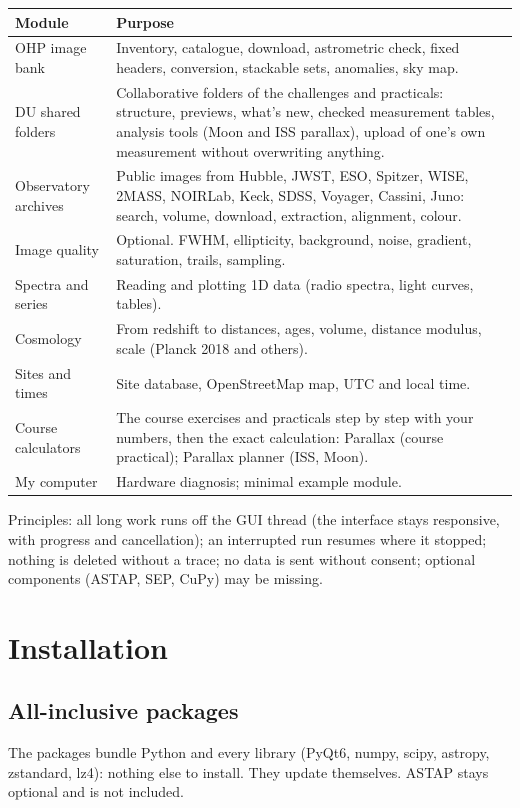 \begin{center}\small
\begin{tabularx}{\linewidth}{@{}lX@{}}
\toprule
\textbf{Module} & \textbf{Purpose}\\
\midrule
OHP image bank & Inventory, catalogue, download, astrometric check, fixed headers, conversion, stackable sets, anomalies, sky map.\\
DU shared folders & Collaborative folders of the challenges and practicals: structure, previews, what's new, checked measurement tables, analysis tools (Moon and ISS parallax), upload of one's own measurement without overwriting anything.\\
Observatory archives & Public images from Hubble, JWST, ESO, Spitzer, WISE, 2MASS, NOIRLab, Keck, SDSS, Voyager, Cassini, Juno: search, volume, download, extraction, alignment, colour.\\
Image quality & Optional. FWHM, ellipticity, background, noise, gradient, saturation, trails, sampling.\\
Spectra and series & Reading and plotting 1D data (radio spectra, light curves, tables).\\
Cosmology & From redshift to distances, ages, volume, distance modulus, scale (Planck 2018 and others).\\
Sites and times & Site database, OpenStreetMap map, UTC and local time.\\
Course calculators & The course exercises and practicals step by step with your numbers, then the exact calculation: Parallax (course practical); Parallax planner (ISS, Moon).\\
My computer & Hardware diagnosis; minimal example module.\\
\bottomrule
\end{tabularx}
\end{center}

Principles: all long work runs off the GUI thread (the interface stays responsive, with progress and
cancellation); an interrupted run resumes where it stopped; nothing is deleted without a trace; no data is sent
without consent; optional components (ASTAP, SEP, CuPy) may be missing.

\section{Installation}
\subsection{All-inclusive packages}
The packages bundle Python and every library (PyQt6, numpy, scipy, astropy, zstandard, lz4): nothing else to
install. They update themselves. ASTAP stays optional and is not included.

